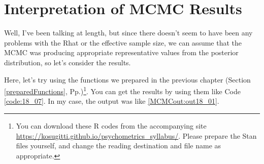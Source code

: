 \documentclass{ltjsbook}
\begin{document}
\section{Interpretation of MCMC Results}
Well, I've been talking at length, but since there doesn't seem to have been any problems with the Rhat or the effective sample size, we can assume that the MCMC was producing appropriate representative values from the posterior distribution, so let's consider the results.

Here, let's try using the functions we prepared in the previous chapter (Section \ref{preparedFunctions}, Pp.\pageref{preparedFunctions})\footnote{You can download these R codes from the accompanying site \url{https://kosugitti.github.io/psychometrics_syllabus/}. Please prepare the Stan files yourself, and change the reading destination and file name as appropriate.}. You can get the results by using them like Code \ref{code:18_07}. In my case, the output was like \ref{MCMCout:out18_01}.




\end{document}
